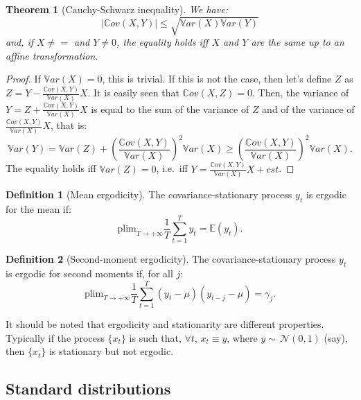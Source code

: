 \documentclass[
  12pt,
]{book}
\newtheorem{theorem}{Theorem}[chapter]
\theoremstyle{definition}
\newtheorem{definition}{Definition}[chapter]
\theoremstyle{definition}
\theoremstyle{definition}
\theoremstyle{definition}
\theoremstyle{remark}
\begin{document}
\begin{theorem}[Cauchy-Schwarz inequality]
\protect\hypertarget{thm:CauchySchwarz}{}\label{thm:CauchySchwarz}We have:
\[
|\mathbb{C}ov(X,Y)| \le \sqrt{\mathbb{V}ar(X)\mathbb{V}ar(Y)}
\]
and, if \(X \ne =\) and \(Y \ne 0\), the equality holds iff \(X\) and \(Y\) are the same up to an affine transformation.
\end{theorem}

\begin{proof}
If \(\mathbb{V}ar(X)=0\), this is trivial. If this is not the case, then let's define \(Z\) as \(Z = Y - \frac{\mathbb{C}ov(X,Y)}{\mathbb{V}ar(X)}X\). It is easily seen that \(\mathbb{C}ov(X,Z)=0\). Then, the variance of \(Y=Z+\frac{\mathbb{C}ov(X,Y)}{\mathbb{V}ar(X)}X\) is equal to the sum of the variance of \(Z\) and of the variance of \(\frac{\mathbb{C}ov(X,Y)}{\mathbb{V}ar(X)}X\), that is:
\[
\mathbb{V}ar(Y) = \mathbb{V}ar(Z) + \left(\frac{\mathbb{C}ov(X,Y)}{\mathbb{V}ar(X)}\right)^2\mathbb{V}ar(X) \ge \left(\frac{\mathbb{C}ov(X,Y)}{\mathbb{V}ar(X)}\right)^2\mathbb{V}ar(X).
\]
The equality holds iff \(\mathbb{V}ar(Z)=0\), i.e.~iff \(Y = \frac{\mathbb{C}ov(X,Y)}{\mathbb{V}ar(X)}X+cst\).
\end{proof}

\begin{definition}[Mean ergodicity]
\protect\hypertarget{def:ergodicity}{}\label{def:ergodicity}The covariance-stationary process \(y_t\) is ergodic for the mean if:
\[
\mbox{plim}_{T \rightarrow +\infty} \frac{1}{T}\sum_{t=1}^T y_t = \mathbb{E}(y_t).
\]
\end{definition}

\begin{definition}[Second-moment ergodicity]
\protect\hypertarget{def:ergod2nd}{}\label{def:ergod2nd}The covariance-stationary process \(y_t\) is ergodic for second moments if, for all \(j\):
\[
\mbox{plim}_{T \rightarrow +\infty} \frac{1}{T}\sum_{t=1}^T (y_t-\mu) (y_{t-j}-\mu) = \gamma_j.
\]
\end{definition}

It should be noted that ergodicity and stationarity are different properties. Typically if the process \(\{x_t\}\) is such that, \(\forall t\), \(x_t \equiv y\), where \(y \sim\,\mathcal{N}(0,1)\) (say), then \(\{x_t\}\) is stationary but not ergodic.

\hypertarget{standard-distributions}{%
\subsection{Standard distributions}\label{standard-distributions}}
\end{document}
